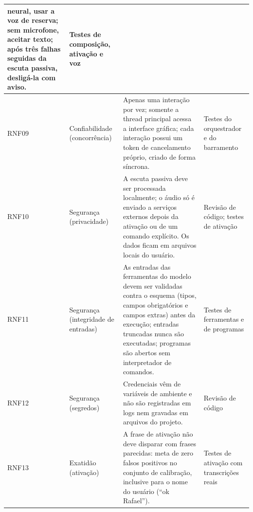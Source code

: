 \begin{singlespace}
\begin{tabularx}{\textwidth}{|C{1.4cm}|P{3.1cm}|L|P{2.8cm}|}
        neural, usar a voz de reserva; sem microfone, aceitar texto; após três falhas seguidas da escuta
        passiva, desligá-la com aviso. & Testes de composição, ativação e voz \\ \hline
RNF09 & Confiabilidade (concorrência) & Apenas uma interação por vez; somente a thread principal acessa a
        interface gráfica; cada interação possui um token de cancelamento próprio, criado de forma síncrona. & Testes do orquestrador e do barramento \\ \hline
RNF10 & Segurança (privacidade) & A escuta passiva deve ser processada localmente; o áudio só é enviado a
        serviços externos depois da ativação ou de um comando explícito. Os dados ficam em arquivos locais
        do usuário. & Revisão de código; testes de ativação \\ \hline
RNF11 & Segurança (integridade de entradas) & As entradas das ferramentas do modelo devem ser validadas
        contra o esquema (tipos, campos obrigatórios e campos extras) antes da execução; entradas truncadas
        nunca são executadas; programas são abertos sem interpretador de comandos. & Testes de ferramentas e de programas \\ \hline
RNF12 & Segurança (segredos) & Credenciais vêm de variáveis de ambiente e não são registradas em logs nem
        gravadas em arquivos do projeto. & Revisão de código \\ \hline
RNF13 & Exatidão (ativação) & A frase de ativação não deve disparar com frases parecidas: meta de zero
        falsos positivos no conjunto de calibração, inclusive para o nome do usuário (“ok Rafael”). & Testes de ativação com transcrições reais \\ \hline
\end{tabularx}
\end{singlespace}

